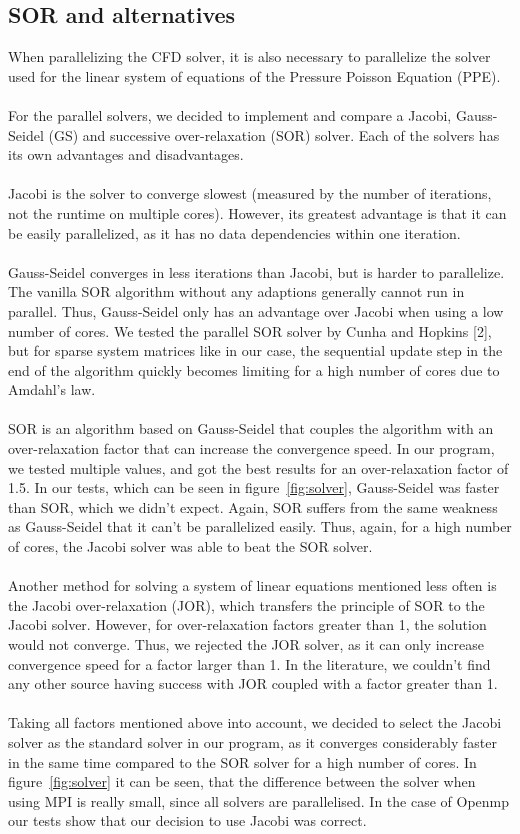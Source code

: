 \documentclass{article}%
\begin{document}
\subsection{SOR and alternatives}
When parallelizing the CFD solver, it is also necessary to parallelize the solver used for the linear system of equations of the Pressure Poisson Equation (PPE).\\
\\
For the parallel solvers, we decided to implement and compare a Jacobi, Gauss-Seidel (GS) and successive over-relaxation (SOR) solver. Each of the solvers has its own advantages and disadvantages.\\
\\
Jacobi is the solver to converge slowest (measured by the number of iterations, not the runtime on multiple cores). However, its greatest advantage is that it can be easily parallelized, as it has no data dependencies within one iteration.\\
\\
Gauss-Seidel converges in less iterations than Jacobi, but is harder to parallelize. The vanilla SOR algorithm without any adaptions generally cannot run in parallel. Thus, Gauss-Seidel only has an advantage over Jacobi when using a low number of cores. We tested the parallel SOR solver by Cunha and Hopkins [2], but for sparse system matrices like in our case, the sequential update step in the end of the algorithm quickly becomes limiting for a high number of cores due to Amdahl’s law.\\
\\
SOR is an algorithm based on Gauss-Seidel that couples the algorithm with an over-relaxation factor that can increase the convergence speed. In our program, we tested multiple values, and got the best results for an over-relaxation factor of 1.5. In our tests, which can be seen in figure~\ref{fig:solver}, Gauss-Seidel was faster than SOR, which we didn't expect. Again, SOR suffers from the same weakness as Gauss-Seidel that it can’t be parallelized easily. Thus, again, for a high number of cores, the Jacobi solver was able to beat the SOR solver.\\
\\
Another method for solving a system of linear equations mentioned less often is the Jacobi over-relaxation (JOR), which transfers the principle of SOR to the Jacobi solver. However, for over-relaxation factors greater than 1, the solution would not converge. Thus, we rejected the JOR solver, as it can only increase convergence speed for a factor larger than 1. In the literature, we couldn’t find any other source having success with JOR coupled with a factor greater than 1.\\
\\
Taking all factors mentioned above into account, we decided to select the Jacobi solver as the standard solver in our program, as it converges considerably faster in the same time compared to the SOR solver for a high number of cores. In figure~\ref{fig:solver} it can be seen, that the difference between the solver when using MPI is really small, since all solvers are parallelised. In the case of Openmp our tests show that our decision to use Jacobi was correct.
\end{document}
